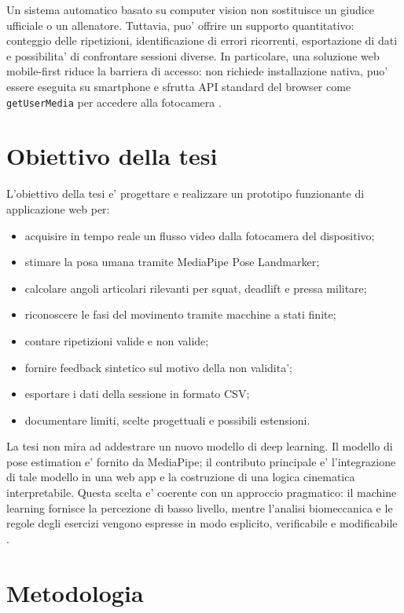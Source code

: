 Un sistema automatico basato su computer vision non sostituisce un giudice ufficiale o un allenatore. Tuttavia, puo' offrire un supporto quantitativo: conteggio delle ripetizioni, identificazione di errori ricorrenti, esportazione di dati e possibilita' di confrontare sessioni diverse. In particolare, una soluzione web mobile-first riduce la barriera di accesso: non richiede installazione nativa, puo' essere eseguita su smartphone e sfrutta API standard del browser come \texttt{getUserMedia} per accedere alla fotocamera \cite{mdnGetUserMedia2026,mdnPwa2026}.

\section{Obiettivo della tesi}

L'obiettivo della tesi e' progettare e realizzare un prototipo funzionante di applicazione web per:

\begin{itemize}
  \item acquisire in tempo reale un flusso video dalla fotocamera del dispositivo;
  \item stimare la posa umana tramite MediaPipe Pose Landmarker;
  \item calcolare angoli articolari rilevanti per squat, deadlift e pressa militare;
  \item riconoscere le fasi del movimento tramite macchine a stati finite;
  \item contare ripetizioni valide e non valide;
  \item fornire feedback sintetico sul motivo della non validita';
  \item esportare i dati della sessione in formato CSV;
  \item documentare limiti, scelte progettuali e possibili estensioni.
\end{itemize}

La tesi non mira ad addestrare un nuovo modello di deep learning. Il modello di pose estimation e' fornito da MediaPipe; il contributo principale e' l'integrazione di tale modello in una web app e la costruzione di una logica cinematica interpretabile. Questa scelta e' coerente con un approccio pragmatico: il machine learning fornisce la percezione di basso livello, mentre l'analisi biomeccanica e le regole degli esercizi vengono espresse in modo esplicito, verificabile e modificabile \cite{geron2019hands,goodfellow2016deep,winter2009biomechanics}.

\section{Metodologia}

